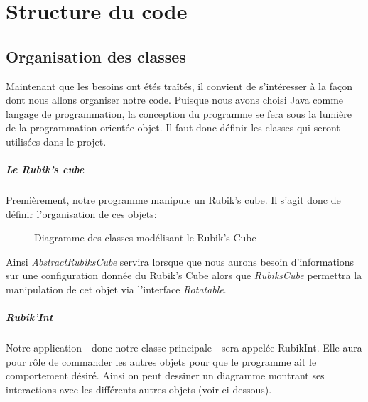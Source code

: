 \chapter{Structure du code}

\section{Organisation des classes}
Maintenant que les besoins ont étés traîtés, il convient de s'intéresser à la façon dont nous allons organiser notre code. 
Puisque nous avons choisi Java comme langage de programmation, la conception du programme se fera sous la lumière de la programmation orientée objet. 
Il faut donc définir les classes qui seront utilisées dans le projet.

\paragraph{Le Rubik's cube} Premièrement, notre programme manipule un Rubik's cube. 
Il s'agit donc de définir l'organisation de ces objets:

\begin{figure}[h]
\begin{center}
\end{center}
    \caption{Diagramme des classes modélisant le Rubik's Cube}
\end{figure}

Ainsi \textit{AbstractRubiksCube} servira lorsque que nous aurons besoin d'informations sur une configuration donnée du Rubik's Cube alors que \textit{RubiksCube} permettra la manipulation de cet objet via l'interface \textit{Rotatable}. 


\paragraph{Rubik'Int} Notre application - donc notre classe principale - sera appelée RubikInt. Elle aura pour rôle de commander les autres objets pour que le programme ait le comportement désiré. Ainsi on peut dessiner un diagramme montrant ses interactions avec les différents autres objets (voir ci-dessous).

